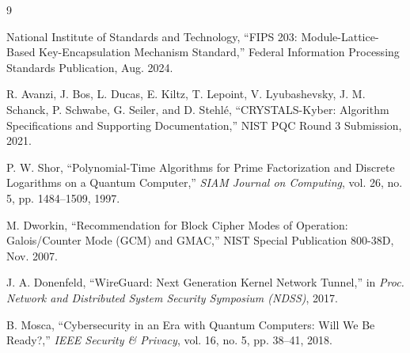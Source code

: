 \documentclass[conference]{IEEEtran}
\begin{document}
\begin{thebibliography}{9}

National Institute of Standards and Technology, ``FIPS 203: Module-Lattice-Based Key-Encapsulation Mechanism Standard,'' Federal Information Processing Standards Publication, Aug. 2024.

R. Avanzi, J. Bos, L. Ducas, E. Kiltz, T. Lepoint, V. Lyubashevsky, J. M. Schanck, P. Schwabe, G. Seiler, and D. Stehlé, ``CRYSTALS-Kyber: Algorithm Specifications and Supporting Documentation,'' NIST PQC Round 3 Submission, 2021.

P. W. Shor, ``Polynomial-Time Algorithms for Prime Factorization and Discrete Logarithms on a Quantum Computer,'' \textit{SIAM Journal on Computing}, vol. 26, no. 5, pp. 1484–1509, 1997.

M. Dworkin, ``Recommendation for Block Cipher Modes of Operation: Galois/Counter Mode (GCM) and GMAC,'' NIST Special Publication 800-38D, Nov. 2007.

J. A. Donenfeld, ``WireGuard: Next Generation Kernel Network Tunnel,'' in \textit{Proc. Network and Distributed System Security Symposium (NDSS)}, 2017.

B. Mosca, ``Cybersecurity in an Era with Quantum Computers: Will We Be Ready?,'' \textit{IEEE Security \& Privacy}, vol. 16, no. 5, pp. 38–41, 2018.

\end{thebibliography}
\end{document}

